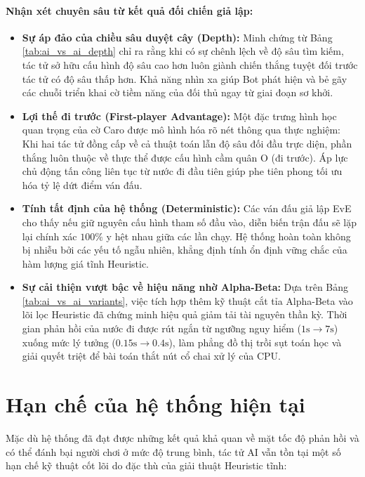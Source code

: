 \paragraph{Nhận xét chuyên sâu từ kết quả đối chiến giả lập:}
\begin{itemize}
	\item \textbf{Sự áp đảo của chiều sâu duyệt cây (Depth):} Minh chứng từ Bảng \ref{tab:ai_vs_ai_depth} chỉ ra rằng khi có sự chênh lệch về độ sâu tìm kiếm, tác tử sở hữu cấu hình độ sâu cao hơn luôn giành chiến thắng tuyệt đối trước tác tử có độ sâu thấp hơn. Khả năng nhìn xa giúp Bot phát hiện và bẻ gãy các chuỗi triển khai cờ tiềm năng của đối thủ ngay từ giai đoạn sơ khởi.
	\item \textbf{Lợi thế đi trước (First-player Advantage):} Một đặc trưng hình học quan trọng của cờ Caro được mô hình hóa rõ nét thông qua thực nghiệm: Khi hai tác tử đồng cấp về cả thuật toán lẫn độ sâu đối đầu trực diện, phần thắng luôn thuộc về thực thể được cấu hình cầm quân O (đi trước). Áp lực chủ động tấn công liên tục từ nước đi đầu tiên giúp phe tiên phong tối ưu hóa tỷ lệ dứt điểm ván đấu.
	\item \textbf{Tính tất định của hệ thống (Deterministic):} Các ván đấu giả lập EvE cho thấy nếu giữ nguyên cấu hình tham số đầu vào, diễn biến trận đấu sẽ lặp lại chính xác $100\%$ y hệt nhau giữa các lần chạy. Hệ thống hoàn toàn không bị nhiễu bởi các yếu tố ngẫu nhiên, khẳng định tính ổn định vững chắc của hàm lượng giá tĩnh Heuristic.
	\item \textbf{Sự cải thiện vượt bậc về hiệu năng nhờ Alpha-Beta:} Dựa trên Bảng \ref{tab:ai_vs_ai_variants}, việc tích hợp thêm kỹ thuật cắt tỉa Alpha-Beta vào lõi lọc Heuristic đã chứng minh hiệu quả giảm tải tài nguyên thần kỳ. Thời gian phản hồi của nước đi được rút ngắn từ ngưỡng nguy hiểm ($1\text{s} \to 7\text{s}$) xuống mức lý tưởng ($0.15\text{s} \to 0.4\text{s}$), làm phẳng đồ thị trồi sụt toán học và giải quyết triệt để bài toán thắt nút cổ chai xử lý của CPU.
\end{itemize}

\section{Hạn chế của hệ thống hiện tại}

Mặc dù hệ thống đã đạt được những kết quả khả quan về mặt tốc độ phản hồi và có thể đánh bại người chơi ở mức độ trung bình, tác tử AI vẫn tồn tại một số hạn chế kỹ thuật cốt lõi do đặc thù của giải thuật Heuristic tĩnh:

